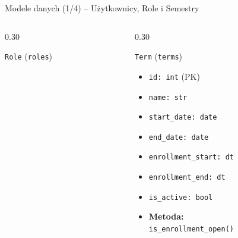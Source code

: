 \documentclass[aspectratio=169, 10pt, xcolor=table]{beamer}
\begin{document}
\begin{frame}{Modele danych (1/4) -- Użytkownicy, Role i Semestry}
\begin{columns}[T, onlytextwidth]
\begin{column}{0.30\textwidth}
\begin{block}{\texttt{Role} (\texttt{roles})}
\begin{itemize}
                \end{itemize}
            \end{block}
        \end{column}
        \begin{column}{0.30\textwidth}
            \begin{exampleblock}{\texttt{Term} (\texttt{terms})}
                \begin{itemize}
                    \item \texttt{id: int} (PK)
                    \item \texttt{name: str}
                    \item \texttt{start\_date: date}
                    \item \texttt{end\_date: date}
                    \item \texttt{enrollment\_start: dt}
                    \item \texttt{enrollment\_end: dt}
                    \item \texttt{is\_active: bool}
                    \item \textbf{Metoda:}\\ \texttt{is\_enrollment\_open()}
                \end{itemize}
            \end{exampleblock}
        \end{column}
    \end{columns}
\end{frame}
\end{document}
